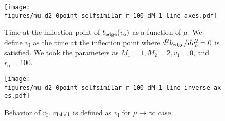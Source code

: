 \documentclass[prd,showpacs,preprintnumbers,groupedaddress,superscriptaddress,nofootinbib,11pt]{revtex4-1} %
\theoremstyle{newplain}
\begin{document}
\begin{figure}[h]
\texttt{[image: figures/mu\_d2\_0point\_selfsimilar\_r\_100\_dM\_1\_line\_axes.pdf]}
\caption{\label{fig:linearlargeaccretion2} 
Time at 
the inflection point of $b_{\rm edge}(v_\text{o})$ as a function of $\mu$.
We define $v_\text{I}$ as the time at the inflection point where $d^2b_{\rm edge}/dv_\text{o}^2 = 0$ is satisfied.
We took the parameters as $M_1 = 1, M_2 = 2, v_1 = 0$, and $r_\text{o} = 100$.
}
\end{figure}



\begin{figure}[h]
\texttt{[image: figures/mu\_d2\_0point\_selfsimilar\_r\_100\_dM\_1\_line\_inverse\_axes.pdf]}
\caption{\label{fig:linearlargeaccretioninverse} 
Behavior of $v_\text{I}$.
$v_{\text{I} {\rm shell}}$ is defined as $v_\text{I}$ for $\mu \to \infty$ case.
}
\end{figure}

\afterpage{\clearpage}
\newpage

%
%
%
%

\end{document}

